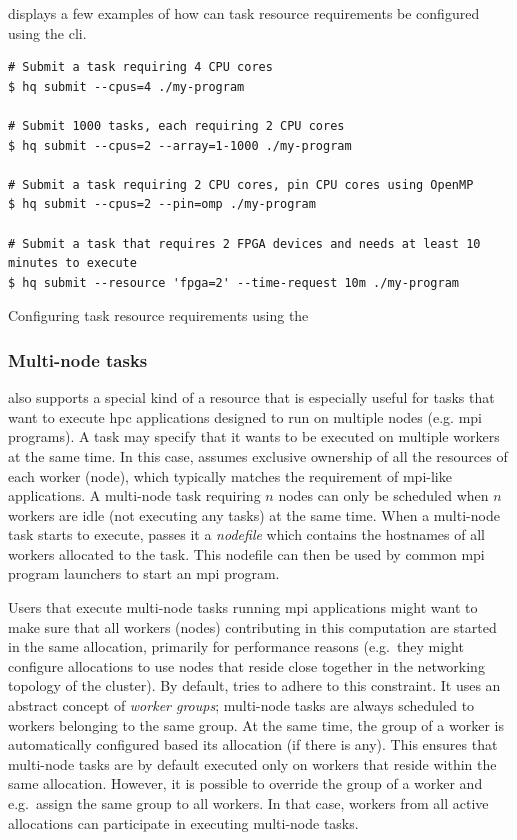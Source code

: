  displays a few examples of how can task resource requirements be
configured using the \gls{cli}.

\begin{listing}[h]
	\begin{verbatim}
# Submit a task requiring 4 CPU cores
$ hq submit --cpus=4 ./my-program

# Submit 1000 tasks, each requiring 2 CPU cores
$ hq submit --cpus=2 --array=1-1000 ./my-program

# Submit a task requiring 2 CPU cores, pin CPU cores using OpenMP
$ hq submit --cpus=2 --pin=omp ./my-program

# Submit a task that requires 2 FPGA devices and needs at least 10 minutes to execute
$ hq submit --resource 'fpga=2' --time-request 10m ./my-program
	\end{verbatim}
	\caption{Configuring task resource requirements using the \hyperqueue{} }
	\label{lst:hq-cli-task-resources}
\end{listing}

\subsubsection*{Multi-node tasks}
\hyperqueue{} also supports a special kind of a resource that is especially useful for
tasks that want to execute \gls{hpc} applications designed to run on multiple nodes
(e.g. \gls{mpi} programs). A task may specify that it wants to be executed on
multiple workers at the same time. In this case, \hq{} assumes exclusive
ownership of all the resources of each worker (node), which typically matches the requirement of
\gls{mpi}-like applications. A multi-node task requiring $n$ nodes
can only be scheduled when $n$ workers are idle (not executing any tasks) at the
same time. When a multi-node task starts to execute, \hq{} passes it a
\emph{nodefile} which contains the hostnames of all workers allocated to the task. This
nodefile can then be used by common \gls{mpi} program launchers to start an
\gls{mpi} program.

Users that execute multi-node tasks running \gls{mpi} applications might want to make
sure that all workers (nodes) contributing in this computation are started in the same allocation,
primarily for performance reasons (e.g.\ they might configure allocations to use nodes that reside
close together in the networking topology of the cluster). By default, \hyperqueue{}
tries to adhere to this constraint. It uses an abstract concept of \emph{worker groups};
multi-node tasks are always scheduled to workers belonging to the same group. At the same time, the
group of a worker is automatically configured based its allocation (if there is any). This ensures
that multi-node tasks are by default executed only on workers that reside within the same
allocation. However, it is possible to override the group of a worker and e.g.\ assign the same
group to all workers. In that case, workers from all active allocations can participate in
executing multi-node tasks.

